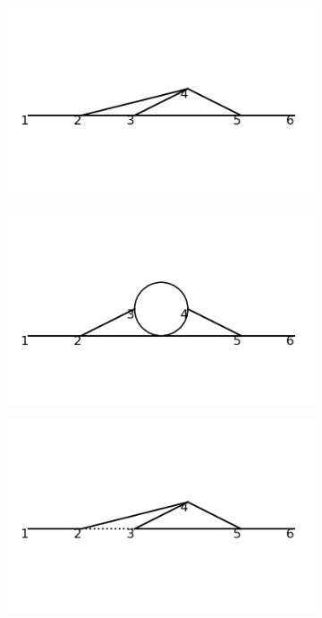 \documentclass[11pt,a4paper,twoside,pdf]{article}
\numberwithin{equation}{section}
\begin{document}
\begin{figure}[h!]
    \centering
    \begin{subfigure}[t]{0.19\textwidth}
        \centering
        \includegraphics[width=\textwidth]{plots/order4_1to1/1.png}
        \caption{ }
    \end{subfigure}%
    \begin{subfigure}[t]{0.19\textwidth}
        \centering
        \includegraphics[width=\textwidth]{plots/order4_1to1/2.png}
        \caption{ }
    \end{subfigure}
    \begin{subfigure}[t]{0.19\textwidth}
        \centering
        \includegraphics[width=\textwidth]{plots/order4_1to1/3.png}

\end{subfigure}
\end{figure}
\end{document}
